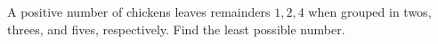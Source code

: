 A positive number of chickens leaves remainders $1,2,4$ when grouped in twos, threes, and fives, respectively. Find the least possible number.
